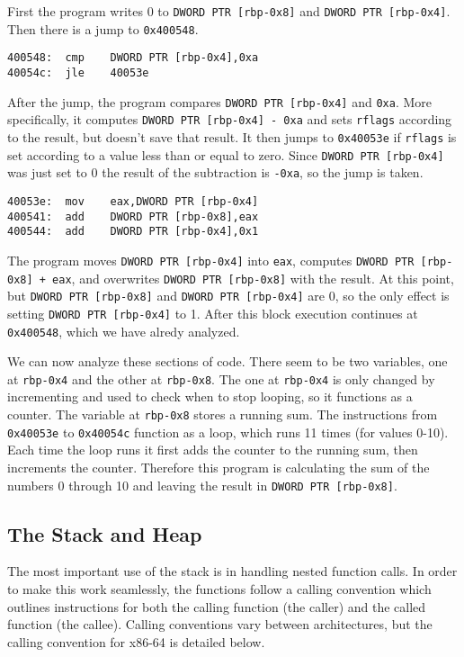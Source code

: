 \documentclass{article}
\begin{document}
First the program writes 0 to \texttt{DWORD PTR [rbp-0x8]} and \texttt{DWORD PTR
[rbp-0x4]}. Then there is a jump to \texttt{0x400548}.

\begin{lstlisting}
400548:  cmp    DWORD PTR [rbp-0x4],0xa
40054c:  jle    40053e
\end{lstlisting}

After the jump, the program compares \texttt{DWORD PTR [rbp-0x4]} and
\texttt{0xa}. More specifically, it computes \texttt{DWORD PTR [rbp-0x4] - 0xa}
and sets \texttt{rflags} according to the result, but doesn't save that result.
It then jumps to \texttt{0x40053e} if \texttt{rflags} is set according to a
value less than or equal to zero.  Since \texttt{DWORD PTR [rbp-0x4]} was just
set to 0 the result of the subtraction is \texttt{-0xa}, so the jump is taken.

\begin{lstlisting}
40053e:  mov    eax,DWORD PTR [rbp-0x4]
400541:  add    DWORD PTR [rbp-0x8],eax
400544:  add    DWORD PTR [rbp-0x4],0x1
\end{lstlisting}

The program moves \texttt{DWORD PTR [rbp-0x4]} into \texttt{eax}, computes
\texttt{DWORD PTR [rbp-0x8] + eax}, and overwrites \texttt{DWORD PTR [rbp-0x8]}
with the result. At this point, but \texttt{DWORD PTR [rbp-0x8]} and
\texttt{DWORD PTR [rbp-0x4]} are 0, so the only effect is setting \texttt{DWORD
PTR [rbp-0x4]} to 1. After this block execution continues at \texttt{0x400548},
which we have alredy analyzed.

We can now analyze these sections of code. There seem to be two variables, one
at \texttt{rbp-0x4} and the other at \texttt{rbp-0x8}. The one at
\texttt{rbp-0x4} is only changed by incrementing and used to check when to
stop looping, so it functions as a counter. The variable at \texttt{rbp-0x8}
stores a running sum. The instructions from \texttt{0x40053e} to
\texttt{0x40054c} function as a loop, which runs 11 times (for values 0-10).
Each time the loop runs it first adds the counter to the running sum, then
increments the counter. Therefore this program is calculating the sum of the
numbers 0 through 10 and leaving the result in \texttt{DWORD PTR [rbp-0x8]}.

\subsection{The Stack and Heap}
The most important use of the stack is in handling nested function calls. In
order to make this work seamlessly, the functions follow a calling convention
which outlines instructions for both the calling function (the caller) and the
called function (the callee). Calling conventions vary between architectures,
but the calling convention for x86-64 is detailed below.
\end{document}
